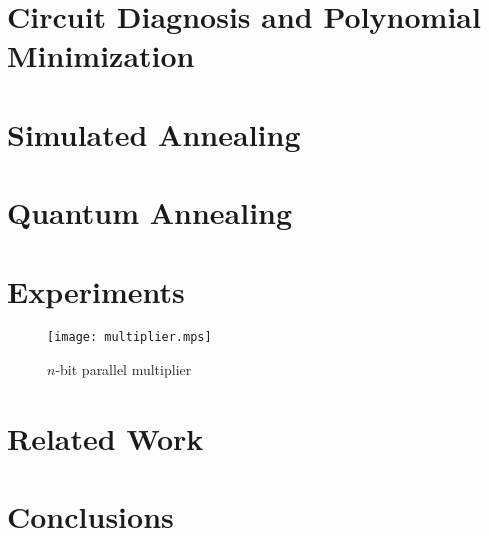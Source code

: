 \documentclass{article}
\begin{document}
\section{Circuit Diagnosis and Polynomial Minimization}
\section{Simulated Annealing}
\section{Quantum Annealing}
\section{Experiments}
%
\begin{figure}[htb]
\centering
\texttt{[image: multiplier.mps]}
\caption{$n$-bit parallel multiplier\label{fig:multiplier}}
\end{figure}
%
\section{Related Work}
\section{Conclusions}
\end{document}

